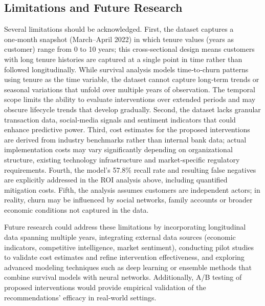 \documentclass[12pt]{article}
\begin{document}
\subsection{Limitations and Future Research}
Several limitations should be acknowledged.  First, the dataset captures a one‑month snapshot (March–April 2022) in which tenure values (years as customer) range from 0 to 10 years; this cross‑sectional design means customers with long tenure histories are captured at a single point in time rather than followed longitudinally.  While survival analysis models time‑to‑churn patterns using tenure as the time variable, the dataset cannot capture long‑term trends or seasonal variations that unfold over multiple years of observation.  The temporal scope limits the ability to evaluate interventions over extended periods and may obscure lifecycle trends that develop gradually.  Second, the dataset lacks granular transaction data, social‑media signals and sentiment indicators that could enhance predictive power.  Third, cost estimates for the proposed interventions are derived from industry benchmarks rather than internal bank data; actual implementation costs may vary significantly depending on organizational structure, existing technology infrastructure and market‑specific regulatory requirements.  Fourth, the model's 57.8\% recall rate and resulting false negatives are explicitly addressed in the ROI analysis above, including quantified mitigation costs.  Fifth, the analysis assumes customers are independent actors; in reality, churn may be influenced by social networks, family accounts or broader economic conditions not captured in the data.

Future research could address these limitations by incorporating longitudinal data spanning multiple years, integrating external data sources (economic indicators, competitive intelligence, market sentiment), conducting pilot studies to validate cost estimates and refine intervention effectiveness, and exploring advanced modeling techniques such as deep learning or ensemble methods that combine survival models with neural networks.  Additionally, A/B testing of proposed interventions would provide empirical validation of the recommendations' efficacy in real‑world settings.
\end{document}
